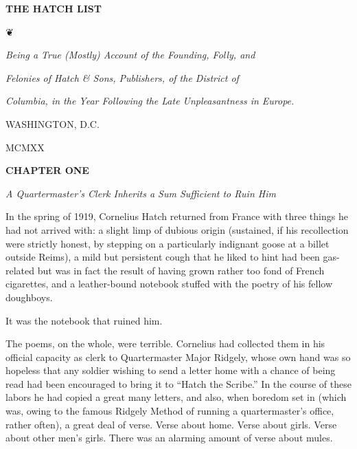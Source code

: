 \documentclass[12pt,openright]{book}
\begin{document}

%



\mainmatter
\pagestyle{fancy}


\textbf{THE HATCH LIST}

❦

\textit{Being a True (Mostly) Account of the Founding, Folly, and}

\textit{Felonies of Hatch \& Sons, Publishers, of the District of}

\textit{Columbia, in the Year Following the Late Unpleasantness in Europe.}

WASHINGTON, D.C.

MCMXX

\textbf{CHAPTER ONE}

\textit{A Quartermaster’s Clerk Inherits a Sum Sufficient to Ruin Him}

In the spring of 1919, Cornelius Hatch returned from France with three things he had not arrived with: a slight limp of dubious origin (sustained, if his recollection were strictly honest, by stepping on a particularly indignant goose at a billet outside Reims), a mild but persistent cough that he liked to hint had been gas-related but was in fact the result of having grown rather too fond of French cigarettes, and a leather-bound notebook stuffed with the poetry of his fellow doughboys.

It was the notebook that ruined him.

The poems, on the whole, were terrible. Cornelius had collected them in his official capacity as clerk to Quartermaster Major Ridgely, whose own hand was so hopeless that any soldier wishing to send a letter home with a chance of being read had been encouraged to bring it to “Hatch the Scribe.” In the course of these labors he had copied a great many letters, and also, when boredom set in (which was, owing to the famous Ridgely Method of running a quartermaster’s office, rather often), a great deal of verse. Verse about home. Verse about girls. Verse about other men’s girls. There was an alarming amount of verse about mules.
\end{document}
